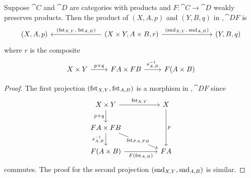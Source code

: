 \begin{lem}
Suppose $\cat{C}$ and $\cat{D}$ are categories with products and $F : \cat{C} \to \cat{D}$ weakly preserves products. Then the product of $(X, A, p)$ and $(Y, B, q)$ in $\comma{\cat{D}}{F}$ is
\[\begin{tikzcd}
	{(X, A, p)} &&& {(\cprod{X}{Y}, \cprod{A}{B}, r)} &&& {(Y, B, q)}
	\arrow["{(\mfst[X,Y],\;\mfst[A,B])}"', from=1-4, to=1-1]
	\arrow["{(\msnd[X,Y],\;\msnd[A,B])}", from=1-4, to=1-7]
\end{tikzcd}\]
where $r$ is the composite
\[\begin{tikzcd}
	{\cprod{X}{Y}} & {\cprod{FA}{FB}} & {F(\cprod{A}{B})}
	\arrow["{\cprod{p}{q}}", from=1-1, to=1-2]
	\arrow["{\inv{\prodcmp[A,B]}}", from=1-2, to=1-3]
\end{tikzcd}\]
\begin{proof}
The first projection $(\mfst[X,Y], \mfst[A,B])$ is a morphism in $\comma{\cat{D}}{F}$ since
\[\begin{tikzcd}
	{\cprod{X}{Y}} && X \\
	{\cprod{FA}{FB}} \\
	{F(\cprod{A}{B})} && FA
	\arrow["{\inv{\prodcmp[A,B]}}"', from=2-1, to=3-1]
	\arrow["{\cprod{p}{q}}"', from=1-1, to=2-1]
	\arrow["{\mfst[X,Y]}", from=1-1, to=1-3]
	\arrow["{F(\mfst[A,B])}"', from=3-1, to=3-3]
	\arrow["{\mfst[FA,FB]}"{description}, from=2-1, to=3-3]
	\arrow["p", from=1-3, to=3-3]
\end{tikzcd}\]
commutes. The proof for the second projection $(\msnd[X,Y], \msnd[A,B])$ is similar.


\end{proof}
\end{lem}
